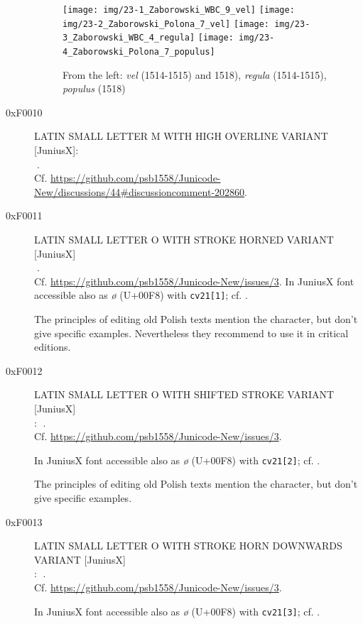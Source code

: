 \documentclass{article}
\newcommand{\Jglyph}[1]{{\relsize{2}\J#1}}
\begin{document}
\begin{description}
  \begin{figure}[h]
    \centering
    \texttt{[image: img/23-1\_Zaborowski\_WBC\_9\_vel]}
    \texttt{[image: img/23-2\_Zaborowski\_Polona\_7\_vel]}
    \texttt{[image: img/23-3\_Zaborowski\_WBC\_4\_regula]}
    \texttt{[image: img/23-4\_Zaborowski\_Polona\_7\_populus]}
    \caption{From the left: \textit{vel} (1514-1515) and 1518), \textit{regula} (1514-1515), \textit{populus} (1518)}
    \label{fig:l}
  \end{figure}
  
\item [0xF0010] LATIN SMALL LETTER M WITH HIGH OVERLINE VARIANT [JuniusX]:\\
  \Jglyph{󰀐}.\\ Cf. \url{https://github.com/psb1558/Junicode-New/discussions/44#discussioncomment-202860}.
 \item [0xF0011] LATIN SMALL LETTER O WITH STROKE HORNED VARIANT [JuniusX]\\
  \Jglyph{󰀑}.\\  Cf. \url{https://github.com/psb1558/Junicode-New/issues/3}.
  In JuniusX font accessible also as \textit{ø} (U+00F8) with \texttt{cv21[1]};
  cf. \autocite[p. 9]{baker20:_opent_featur_junius_junius}.

  The principles of editing old Polish texts
  \autocite{Górski_Konrad__Zasady} mention the character, but don't
  give specific examples. Nevertheless they recommend to use it in
  critical editions.
  
\item [0xF0012] LATIN SMALL LETTER O WITH SHIFTED STROKE VARIANT [JuniusX]\\:
  \Jglyph{󰀒}.\\  Cf. \url{https://github.com/psb1558/Junicode-New/issues/3}.
  
  In JuniusX font accessible also as \textit{ø} (U+00F8) with \texttt{cv21[2]};
 cf. \autocite[p. 9]{baker20:_opent_featur_junius_junius}.

 The principles of editing old Polish texts
  \autocite{Górski_Konrad__Zasady} mention the character, but don't
  give specific examples. 

\item [0xF0013] LATIN SMALL LETTER O WITH STROKE HORN DOWNWARDS VARIANT [JuniusX]\\:
  \Jglyph{󰀓}.\\  Cf. \url{https://github.com/psb1558/Junicode-New/issues/3}.

  In JuniusX font accessible also as \textit{ø} (U+00F8) with \texttt{cv21[3]};
  cf. \autocite[p. 9]{baker20:_opent_featur_junius_junius}.


\end{description}
\end{document}
